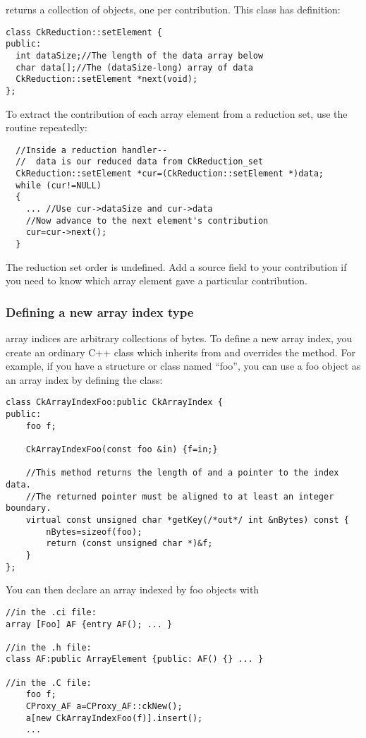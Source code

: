  returns a collection of  objects, one per contribution.  This class has definition:
\begin{verbatim}
class CkReduction::setElement {
public:
  int dataSize;//The length of the data array below
  char data[];//The (dataSize-long) array of data
  CkReduction::setElement *next(void);
};
\end{verbatim}

To extract the contribution of each array element from a reduction set, use the  routine repeatedly:
\begin{verbatim}
  //Inside a reduction handler-- 
  //  data is our reduced data from CkReduction_set
  CkReduction::setElement *cur=(CkReduction::setElement *)data;
  while (cur!=NULL)
  {
    ... //Use cur->dataSize and cur->data
    //Now advance to the next element's contribution
    cur=cur->next();
  }
\end{verbatim}

The reduction set order is undefined.  Add a source field to your contribution if you need to know which array element gave a particular contribution.

\subsubsection{Defining a new array index type}
\charmpp array indices are arbitrary collections of bytes.
To define a new array index, you create an ordinary C++ class 
which inherits from  and overrides the  method.  
For example, if you have a structure or class named ``foo'', you 
can use a foo object as an array index by defining the class:

\begin{verbatim}
class CkArrayIndexFoo:public CkArrayIndex {
public:
    foo f;

    CkArrayIndexFoo(const foo &in) {f=in;}

    //This method returns the length of and a pointer to the index data.
    //The returned pointer must be aligned to at least an integer boundary.
    virtual const unsigned char *getKey(/*out*/ int &nBytes) const {
      	nBytes=sizeof(foo);
        return (const unsigned char *)&f;
    }
};
\end{verbatim}

You can then declare an array indexed by foo objects with

\begin{verbatim}
//in the .ci file:
array [Foo] AF {entry AF(); ... }

//in the .h file:
class AF:public ArrayElement {public: AF() {} ... }

//in the .C file:
    foo f;
    CProxy_AF a=CProxy_AF::ckNew();
    a[new CkArrayIndexFoo(f)].insert();
    ...
\end{verbatim}


